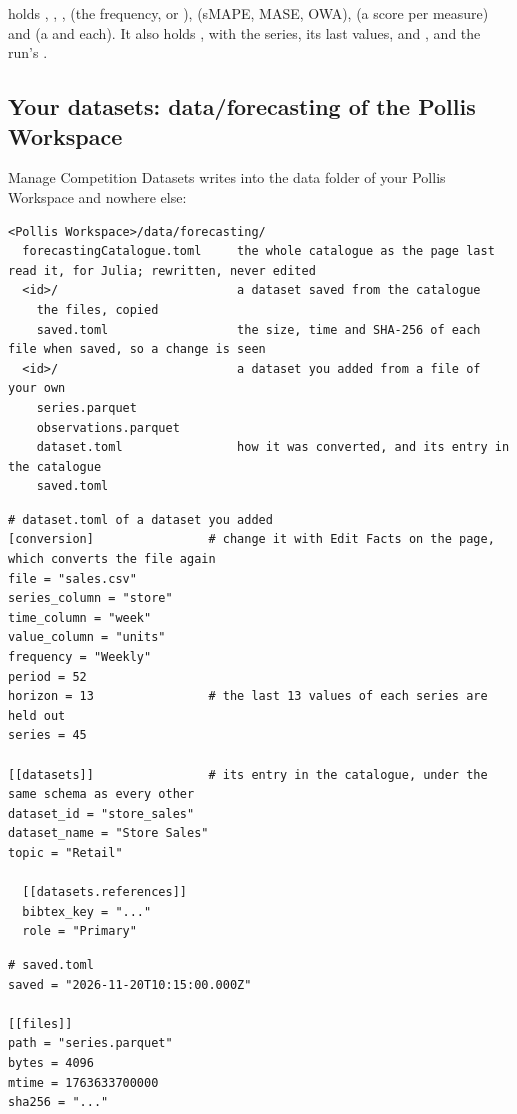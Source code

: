  holds , , ,  (the frequency, or
),  (sMAPE, MASE, OWA),  (a score per measure) and  (a
 and  each). It also holds , with the series, its last  values,
 and , and the run's .

\subsection{Your datasets: data/forecasting of the Pollis Workspace}
\label{sec:workspace}

Manage Competition Datasets writes into the data folder of your Pollis Workspace and nowhere else:

\begin{lstlisting}
<Pollis Workspace>/data/forecasting/
  forecastingCatalogue.toml     the whole catalogue as the page last read it, for Julia; rewritten, never edited
  <id>/                         a dataset saved from the catalogue
    the files, copied
    saved.toml                  the size, time and SHA-256 of each file when saved, so a change is seen
  <id>/                         a dataset you added from a file of your own
    series.parquet
    observations.parquet
    dataset.toml                how it was converted, and its entry in the catalogue
    saved.toml
\end{lstlisting}

\begin{lstlisting}
# dataset.toml of a dataset you added
[conversion]                # change it with Edit Facts on the page, which converts the file again
file = "sales.csv"
series_column = "store"
time_column = "week"
value_column = "units"
frequency = "Weekly"
period = 52
horizon = 13                # the last 13 values of each series are held out
series = 45

[[datasets]]                # its entry in the catalogue, under the same schema as every other
dataset_id = "store_sales"
dataset_name = "Store Sales"
topic = "Retail"

  [[datasets.references]]
  bibtex_key = "..."
  role = "Primary"
\end{lstlisting}

\begin{lstlisting}
# saved.toml
saved = "2026-11-20T10:15:00.000Z"

[[files]]
path = "series.parquet"
bytes = 4096
mtime = 1763633700000
sha256 = "..."
\end{lstlisting}

